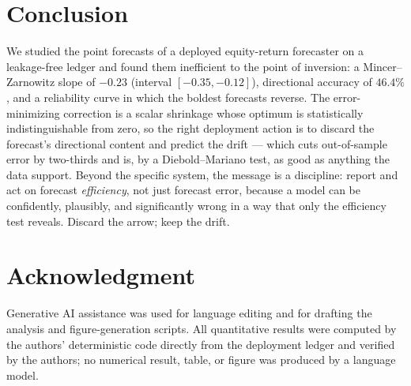 \documentclass[10pt,twocolumn,twoside]{eec_style}
\begin{document}
\section{Conclusion}
\label{sec:conclusion}
We studied the point forecasts of a deployed equity-return forecaster on a leakage-free
ledger and found them inefficient to the point of inversion: a Mincer--Zarnowitz slope
of $-0.23$ (interval $[-0.35,-0.12]$), directional accuracy of $46.4\%$, and a
reliability curve in which the boldest forecasts reverse. The error-minimizing correction is
a scalar shrinkage whose optimum is statistically indistinguishable from zero, so the
right deployment action is to discard the forecast's directional content and predict the
drift --- which cuts out-of-sample error by two-thirds and is, by a Diebold--Mariano test,
as good as anything the data support. Beyond the specific system, the message is a
discipline: report and act on forecast \emph{efficiency}, not just forecast error,
because a model can be confidently, plausibly, and significantly wrong in a way that only
the efficiency test reveals. Discard the arrow; keep the drift.

\section*{Acknowledgment}
Generative AI assistance was used for language editing and for drafting the analysis and
figure-generation scripts. All quantitative results were computed by the authors'
deterministic code directly from the deployment ledger and verified by the authors; no
numerical result, table, or figure was produced by a language model.
\end{document}

